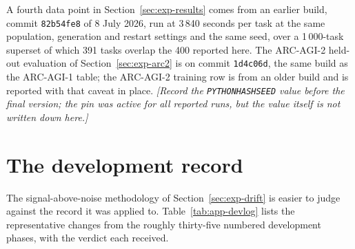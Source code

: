 A fourth data point in Section~\ref{sec:exp-results} comes from an earlier build, commit
\texttt{82b54fe8} of 8 July 2026, run at 3\,840 seconds per task at the same population,
generation and restart settings and the same seed, over a 1\,000-task superset of which 391
tasks overlap the 400 reported here. The ARC-AGI-2 held-out evaluation of
Section~\ref{sec:exp-arc2} is on commit \texttt{1d4c06d}, the same build as the ARC-AGI-1
table; the ARC-AGI-2 training row is from an older build and is reported with that caveat in
place. \textit{[Record the \texttt{PYTHONHASHSEED} value before the final version; the pin
was active for all reported runs, but the value itself is not written down here.]}

\section{The development record}
\label{app:devlog}

The signal-above-noise methodology of Section~\ref{sec:exp-drift} is easier to judge against
the record it was applied to. Table~\ref{tab:app-devlog} lists the representative changes
from the roughly thirty-five numbered development phases, with the verdict each received.

